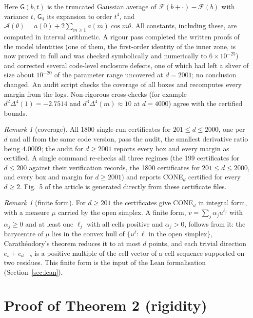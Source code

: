 \documentclass[11pt]{amsart}
\theoremstyle{definition}
\theoremstyle{remark}
\newtheorem{remark}[theorem]{Remark}
\numberwithin{equation}{section}
\begin{document}
Here $\mathsf G(b,t)$ is the truncated Gaussian average of $\mathcal F(b+\cdot)-\mathcal F(b)$ with variance $t$, $\mathsf G_4$ its
expansion to order $t^4$, and $\mathcal A(\theta)=a(0)+2\sum_{m\ge1}a(m)\cos m\theta$. All constants, including these, are
computed in interval arithmetic. A rigour pass completed the written proofs of the model identities (one of them, the
first-order identity of the inner zone, is now proved in full and was checked symbolically and numerically to
$6\times10^{-25}$) and corrected several code-level enclosure defects, one of which had left a sliver of size about
$10^{-20}$ of the parameter range uncovered at $d=2001$; no conclusion changed. An audit script checks the coverage of
all boxes and recomputes every margin from the logs. Non-rigorous cross-checks (for example $d^2\Delta^4(1)=-2.7514$ and
$d^3\Delta^4(m)\approx10$ at $d=4000$) agree with the certified bounds.

\begin{remark}[coverage]
All 1800 single-run certificates for $201\le d\le2000$, one per $d$ and all from the same code version, pass the audit,
the smallest derivative ratio being $4.0009$; the audit for $d\ge2001$ reports every box and every margin as certified.
A single command re-checks all three regimes (the 199 certificates for $d\le200$ against their verification records,
the 1800 certificates for $201\le d\le2000$, and every box and margin for $d\ge2001$) and reports CONE$_d$ certified for
every $d\ge2$. Fig.~5 of the article is generated directly from these certificate files.
\end{remark}

\begin{remark}[finite form]\label{rem:finite}
For $d\ge201$ the certificates give CONE$_d$ in integral form, with a measure $\mu$ carried by the open simplex. A
finite form, $v=\sum_j\alpha_ju^{\ell_j}$ with $\alpha_j\ge0$ and at least one $\ell_j$ with all cells positive and
$\alpha_j>0$, follows from it: the barycentre of $\mu$ lies in the convex hull of $\{u^\ell:\ell\text{ in the open
simplex}\}$, Carath\'eodory's theorem reduces it to at most $d$ points, and each trivial direction $e_s+e_{d-s}$ is a
positive multiple of the cell vector of a cell sequence supported on two residues. This finite form is the input of the
Lean formalisation (Section~\ref{sec:lean}).
\end{remark}

\section{Proof of Theorem 2 (rigidity)}\label{sec:rigidity}
\end{document}
